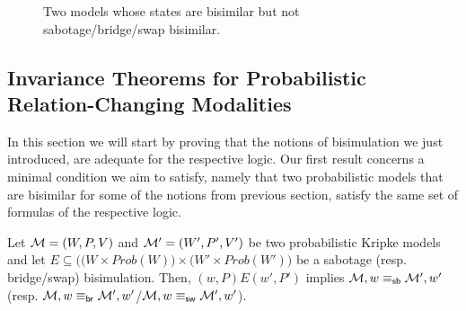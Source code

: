 \begin{figure}
    \centering
        \begin{minipage}{0.48\linewidth}
        \centering
        \end{minipage}\begin{minipage}{0.48\linewidth}
        \centering
        \end{minipage}
    \caption{Two models whose states are bisimilar but not sabotage/bridge/swap bisimilar.}
    \label{ex_not_bis}
\end{figure}

\subsection{Invariance Theorems for Probabilistic Relation-Changing Modalities}
\label{sec:invariance}

In this section we will start by proving that the notions of bisimulation we just introduced, are adequate for the respective logic. Our first result concerns a minimal condition we aim to satisfy, namely that two probabilistic models that are bisimilar for some of the notions from previous section, satisfy the same set of formulas of the respective logic. 

\begin{theorem}[Invariance]\label{th:invariance}
    Let $\mathcal{M}=(W,P,V)$ and $\mathcal{M}'=(W',P',V')$ be two probabilistic Kripke models and let $E\subseteq \big((W\times Prob(W)\big) \times \big(W'\times Prob(W')\big)$ be a sabotage (resp. bridge/swap) bisimulation. Then, $(w,P)E(w',P')$ implies $\mathcal{M},w\equiv_{\mathsf{sb}}\mathcal{M}',w'$ (resp. $\mathcal{M},w\equiv_{\mathsf{br}}\mathcal{M}',w'$/$\mathcal{M},w\equiv_{\mathsf{sw}}\mathcal{M}',w'$).
\end{theorem}

